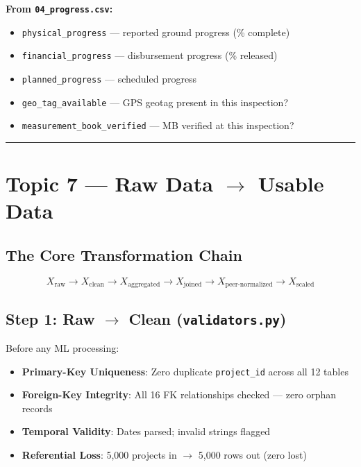 \documentclass[11pt,a4paper]{article}
\begin{document}
\textbf{From \texttt{04\_progress.csv}:}
\begin{itemize}[leftmargin=1.5em, itemsep=2pt, topsep=3pt]
\item \texttt{physical\_progress} --- reported ground progress (\% complete)
\item \texttt{financial\_progress} --- disbursement progress (\% released)
\item \texttt{planned\_progress} --- scheduled progress
\item \texttt{geo\_tag\_available} --- GPS geotag present in this inspection?
\item \texttt{measurement\_book\_verified} --- MB verified at this inspection?
\end{itemize}

\vspace{1em}\hrule\vspace{1em}

\section{Topic 7 --- Raw Data $\rightarrow$ Usable Data}

\subsection{The Core Transformation Chain}

\[ X_\text{raw} \rightarrow X_\text{clean} \rightarrow X_\text{aggregated} \rightarrow X_\text{joined} \rightarrow X_\text{peer-normalized} \rightarrow X_\text{scaled} \]

\subsection{Step 1: Raw $\rightarrow$ Clean (\texttt{validators.py})}

Before any ML processing:
\begin{itemize}[leftmargin=1.5em, itemsep=2pt, topsep=3pt]
\item \textbf{Primary-Key Uniqueness}: Zero duplicate \texttt{project\_id} across all 12 tables
\item \textbf{Foreign-Key Integrity}: All 16 FK relationships checked --- zero orphan records
\item \textbf{Temporal Validity}: Dates parsed; invalid strings flagged
\item \textbf{Referential Loss}: 5,000 projects in $\rightarrow$ 5,000 rows out (zero lost)
\end{itemize}
\end{document}
